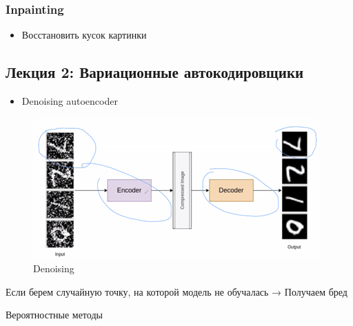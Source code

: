\documentclass[a4paper, 12pt]{article}
\begin{document}
\subsubsection{Inpainting}\label{inpainting}

\begin{itemize}
\item
  
  Восстановить кусок картинки
  
\end{itemize}

\subsection{Лекция 2: Вариационные
автокодировщики}

\begin{itemize}
\item
  
  Denoising autoencoder
  
\end{itemize}
\begin{figure}[h]
    \centering
    \includegraphics[width=4.31487in,height=2.13484in]{media/image4.png}
    \caption{Denoising}
    \label{fig:my_label}
\end{figure}

Если берем случайную точку, на которой модель не обучалась → Получаем
бред

{Вероятностные методы}
\end{document}
